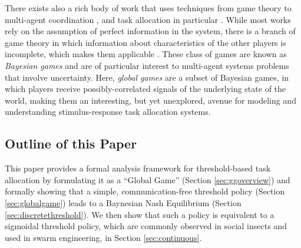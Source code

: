 \documentclass[smallextended]{svjour3}       %
\begin{document}
There exists also a rich body of work that uses techniques from game theory to multi-agent coordination \citep{parsons2002game,nisan2007algorithmic}, and task allocation in particular \citep{shehory1998methods}. While most works rely on the assumption of perfect information in the system, there is a branch of game theory in which information about characteristics of the other players is incomplete, which makes them applicable . These class of games are known as \emph{Bayesian games} \citep{harsanyi2004games} and are of particular interest to multi-agent systems problems that involve uncertainty. Here, \emph{global games} \citep{Carlsson1993} are a subset of Bayesian games, in which players receive possibly-correlated signals of the underlying state of the world, making them an interesting, but yet unexplored, avenue for modeling and understanding stimulus-response task allocation systems. 

\subsection{Outline of this Paper}
This paper provides a formal analysis framework for threshold-based task allocation by formulating it as a ``Global Game'' (Section \ref{sec:ggoverview}) and formally showing that a simple, communication-free threshold policy (Section \ref{sec:globalgame}) leads to a Baynesian Nash Equilibrium (Section \ref{sec:discretethreshold}). We then show that such a policy is equivalent to a sigmoidal threshold policy, which are commonly observed in social insects and used in swarm engineering, in Section \ref{sec:continuous}.

\end{document}
